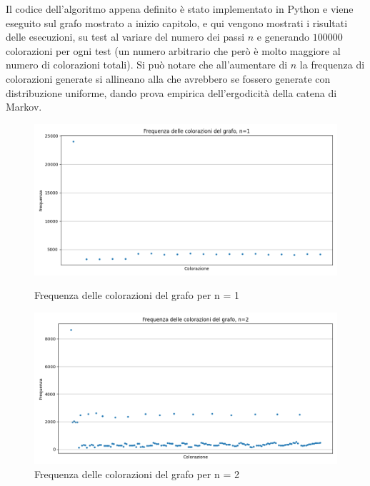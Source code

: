 \documentclass{article}
\begin{document}
Il codice dell'algoritmo appena definito è stato implementato in Python e viene eseguito sul grafo mostrato a inizio capitolo, e qui vengono mostrati i risultati delle esecuzioni, su test al variare del numero dei passi $n$ e generando $100000$ colorazioni per ogni test (un numero arbitrario che però è molto maggiore al numero di colorazioni totali). Si può notare che all'aumentare di $n$ la frequenza di colorazioni generate si allineano alla che avrebbero se fossero generate con distribuzione uniforme, dando prova empirica dell'ergodicità della catena di Markov.

\begin{figure}[!ht]
    \centering
    \begin{minipage}{0.45\textwidth}
        \centering
        \includegraphics[width=\linewidth]{img/grafico_frequenza_colorazioni_n1.png}
        \caption{Frequenza delle colorazioni del grafo per n = 1}
        \label{fig:immagine1}
    \end{minipage}\hfill
    \begin{minipage}{0.45\textwidth}
        \centering
        \includegraphics[width=\linewidth]{img/grafico_frequenza_colorazioni_n2.png}
        \caption{Frequenza delle colorazioni del grafo per n = 2}
        \label{fig:immagine2}
    \end{minipage}
\end{figure}
\end{document}
